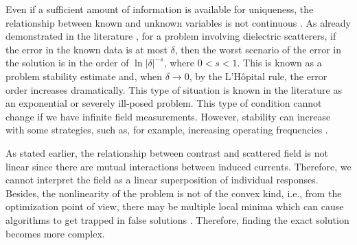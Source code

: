 			Even if a sufficient amount of information is available for uniqueness, the relationship between known and unknown variables is not continuous \citep{chen2017}. As already demonstrated in the literature \citep{stefanov1990stability,caro2010stable}, for a problem involving dielectric scatterers, if the error in the known data is at most $\delta$, then the worst scenario of the error in the solution is in the order of $\ln|\delta|^{-s}$, where $0<s<1$. This is known as a problem stability estimate and, when $\delta\rightarrow0$, by the L'Hôpital rule, the error order increases dramatically. This type of situation is known in the literature as an exponential or severely ill-posed problem. This type of condition cannot change if we have infinite field measurements. However, stability can increase with some strategies, such as, for example, increasing operating frequencies \citep{bao2015inverse,nagayasu2013increasing,isakov2016increasing}.
			
			As stated earlier, the relationship between contrast and scattered field is not linear since there are mutual interactions between induced currents. Therefore, we cannot interpret the field as a linear superposition of individual responses. Besides, the nonlinearity of the problem is not of the convex kind, i.e., from the optimization point of view, there may be multiple local minima which can cause algorithms to get trapped in false solutions \citep{chen2017,bucci1997electromagnetic}. Therefore, finding the exact solution becomes more complex. 
			
